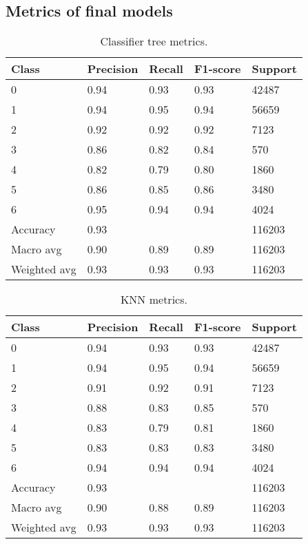 \documentclass[conference]{IEEEtran}
\begin{document}
\subsection{Metrics of final models}

\begin{table}[htbp]
	\centering
	\begin{tabular}{lllll}
		\toprule
		\textbf{Class} & \textbf{Precision} & \textbf{Recall} & \textbf{F1-score} & \textbf{Support} \\
		\midrule
		0 & 0.94 & 0.93 & 0.93 & 42487 \\
		1 & 0.94 & 0.95 & 0.94 & 56659 \\
		2 & 0.92 & 0.92 & 0.92 & 7123 \\
		3 & 0.86 & 0.82 & 0.84 & 570 \\
		4 & 0.82 & 0.79 & 0.80 & 1860 \\
		5 & 0.86 & 0.85 & 0.86 & 3480 \\
		6 & 0.95 & 0.94 & 0.94 & 4024 \\
		\midrule
		Accuracy & 0.93 & & & 116203 \\
		Macro avg & 0.90 & 0.89 & 0.89 & 116203 \\
		Weighted avg & 0.93 & 0.93 & 0.93 & 116203 \\
		\bottomrule
	\end{tabular}
	\caption{Classifier tree metrics.}
	\label{tab:tree-result}
\end{table}

\begin{table}[htbp]
	\centering
	\begin{tabular}{lllll}
		\toprule
		\textbf{Class} & \textbf{Precision} & \textbf{Recall} & \textbf{F1-score} & \textbf{Support} \\
		\midrule
		0 & 0.94 & 0.93 & 0.93 & 42487 \\
		1 & 0.94 & 0.95 & 0.94 & 56659 \\
		2 & 0.91 & 0.92 & 0.91 & 7123 \\
		3 & 0.88 & 0.83 & 0.85 & 570 \\
		4 & 0.83 & 0.79 & 0.81 & 1860 \\
		5 & 0.83 & 0.83 & 0.83 & 3480 \\
		6 & 0.94 & 0.94 & 0.94 & 4024 \\
		\midrule
		Accuracy & 0.93 & & & 116203 \\
		Macro avg & 0.90 & 0.88 & 0.89 & 116203 \\
		Weighted avg & 0.93 & 0.93 & 0.93 & 116203 \\
		\bottomrule
	\end{tabular}
	\caption{KNN metrics.}
	\label{tab:knn-result}
\end{table}
\end{document}
